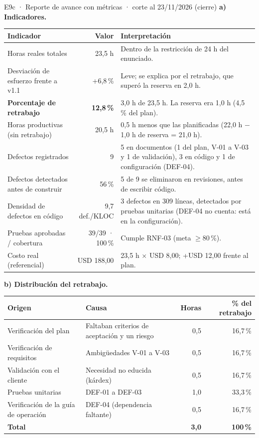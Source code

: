 \documentclass[11pt,a4paper]{article}
\begin{document}
\begin{evidencia}{E9c · Reporte de avance con métricas · corte al 23/11/2026 (cierre)}
\small
\textbf{a) Indicadores.}

\begin{tabularx}{\linewidth}{@{}L r L@{}}
\toprule
\textbf{Indicador} & \textbf{Valor} & \textbf{Interpretación} \\
\midrule
Horas reales totales & 23,5 h & Dentro de la restricción de 24 h del enunciado. \\
Desviación de esfuerzo frente a v1.1 & +6,8\,\% & Leve; se explica por el retrabajo, que superó la reserva en 2,0 h. \\
\textbf{Porcentaje de retrabajo} & \textbf{12,8\,\%} & 3,0 h de 23,5 h. La reserva era 1,0 h (4,5\,\% del plan). \\
Horas productivas (sin retrabajo) & 20,5 h & 0,5 h menos que las planificadas (22,0 h $-$ 1,0 h de reserva = 21,0 h). \\
Defectos registrados & 9 & 5 en documentos (1 del plan, V-01 a V-03 y 1 de validación), 3 en código y 1 de configuración (DEF-04). \\
Defectos detectados antes de construir & 56\,\% & 5 de 9 se eliminaron en revisiones, antes de escribir código. \\
Densidad de defectos en código & 9,7 def./KLOC & 3 defectos en 309 líneas, detectados por pruebas unitarias (DEF-04 no cuenta: está en la configuración). \\
Pruebas aprobadas / cobertura & 39/39 · 100\,\% & Cumple RNF-03 (meta $\geq 80$\,\%). \\
Costo real (referencial) & USD 188,00 & 23,5 h $\times$ USD 8,00; +USD 12,00 frente al plan. \\
\bottomrule
\end{tabularx}

\vspace{0.3cm}
\textbf{b) Distribución del retrabajo.}

\begin{tabularx}{\linewidth}{@{}l L r r@{}}
\toprule
\textbf{Origen} & \textbf{Causa} & \textbf{Horas} & \textbf{\% del retrabajo} \\
\midrule
Verificación del plan & Faltaban criterios de aceptación y un riesgo & 0,5 & 16,7\,\% \\
Verificación de requisitos & Ambigüedades V-01 a V-03 & 0,5 & 16,7\,\% \\
Validación con el cliente & Necesidad no educida (kárdex) & 0,5 & 16,7\,\% \\
Pruebas unitarias & DEF-01 a DEF-03 & 1,0 & 33,3\,\% \\
Verificación de la guía de operación & DEF-04 (dependencia faltante) & 0,5 & 16,7\,\% \\
\midrule
\textbf{Total} & & \textbf{3,0} & \textbf{100\,\%} \\
\bottomrule
\end{tabularx}


\end{evidencia}
\end{document}
